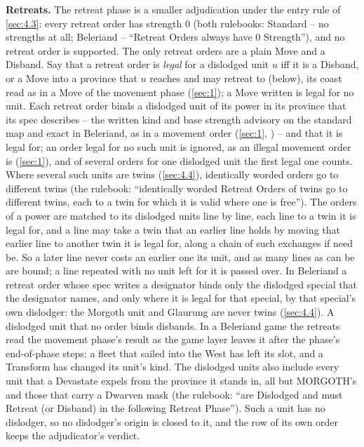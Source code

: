 \documentclass[12pt,a4paper]{article}
\begin{document}
\textbf{Retreats.}
The retreat phase is a smaller adjudication under the entry rule of \cref{sec:4.3}: every retreat order has strength 0 (both rulebooks: Standard -- no strengths at all; Beleriand -- ``Retreat Orders always have 0 Strength''), and no retreat order is supported.
The only retreat orders are a plain Move and a Disband.
Say that a retreat order is \emph{legal} for a dislodged unit $u$ iff it is a Disband, or a Move into a province that $u$ reaches and may retreat to (below), its coast read as in a Move of the movement phase (\cref{sec:1}); a Move written  is legal for no unit.
Each retreat order binds a dislodged unit of its power in its province that its spec describes -- the written kind and base strength advisory on the standard map and exact in Beleriand, as in a movement order (\cref{sec:1}, ) -- and that it is legal for; an order legal for no such unit is ignored, as an illegal movement order is (\cref{sec:1}), and of several orders for one dislodged unit the first legal one counts.
Where several such units are twins (\cref{sec:4.4}), identically worded orders go to different twins (the rulebook: ``identically worded Retreat Orders of twins go to different twins, each to a twin for which it is valid where one is free'').
The orders of a power are matched to its dislodged units line by line, each line to a twin it is legal for, and a line may take a twin that an earlier line holds by moving that earlier line to another twin it is legal for, along a chain of such exchanges if need be.
So a later line never costs an earlier one its unit, and as many lines as can be are bound; a line repeated with no unit left for it is passed over.
In Beleriand a retreat order whose spec writes a designator binds only the dislodged special that the designator names, and only where it is legal for that special, by that special's own dislodger: the Morgoth unit and Glaurung are never twins (\cref{sec:4.4}).
A dislodged unit that no order binds disbands.
In a Beleriand game the retreats read the movement phase's result as the game layer leaves it after the phase's end-of-phase steps: a fleet that sailed into the West has left its slot, and a Transform has changed its unit's kind.
The dislodged units also include every unit that a Devastate expels from the province it stands in, all but MORGOTH's and those that carry a Dwarven mask (the rulebook: ``are Dislodged and must Retreat (or Disband) in the following Retreat Phase'').
Such a unit has no dislodger, so no dislodger's origin is closed to it, and the row of its own order keeps the adjudicator's verdict.\\
\end{document}
